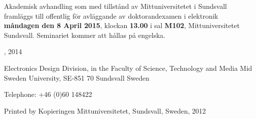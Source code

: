 \thispagestyle{empty}

{\raggedright
Akademisk avhandling som med tillstånd av Mittuniversitetet i Sundsvall framläggs till offentlig för avläggande av doktorandexamen i elektronik \textbf{måndagen den 8 April 2015}, klockan \textbf{13.00} i sal \textbf{M102}, Mittuniversitetet Sundsvall. Seminariet kommer att hållas på engelska.

\vfill

{\large\thetitle}

\vspace{1cm}

\theauthor

\vspace{1cm}

\textcopyright \theauthor, 2014
\vspace{1cm}

Electronics Design Division, in the
Faculty of Science, Technology and Media
Mid Sweden University, SE-851 70 Sundsvall
Sweden

\vspace{1cm}

Telephone: +46 (0)60 148422

\vspace{1cm}

Printed by Kopieringen Mittuniversitetet, Sundsvall, Sweden, 2012
}